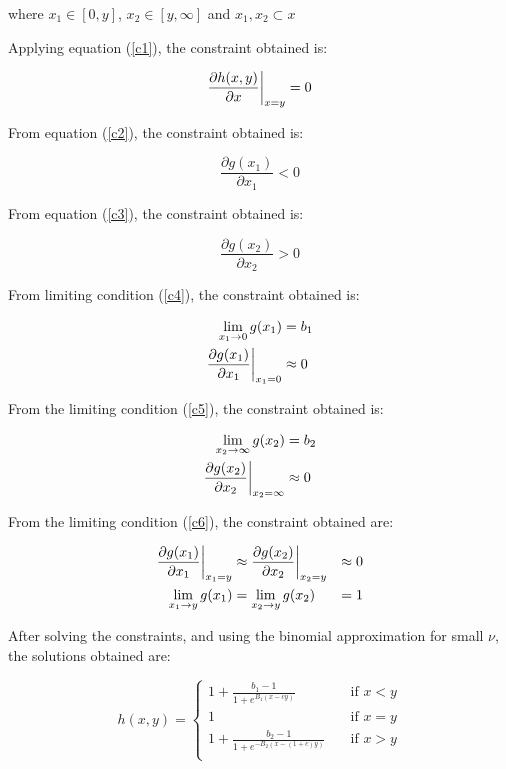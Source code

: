 where $x_1 \in [0, y]$, $x_2 \in [y, \infty]$ and $x_1, x_2 \subset x$

Applying equation (\ref{c1}), the constraint obtained is:

\begin{equation}
\frac{\partial h(x, y)}{\partial x}\at[\bigg]{x=y} = 0
\end{equation}

From equation (\ref{c2}), the constraint obtained is:

\begin{equation*}
\frac{\partial g(x_1)}{\partial x_1} < 0
\end{equation*}

From equation (\ref{c3}), the constraint obtained is:

\begin{equation*}
\frac{\partial g(x_2)}{\partial x_2} > 0
\end{equation*}


From limiting condition (\ref{c4}), the constraint obtained is: 

\begin{align}
\lim_{x_1 \to 0} g(x_1) &= b_1 \\
\frac{\partial g(x_1)}{\partial x_1}\at[\bigg]{x_1 = 0} &\approx 0
\end{align}

From the limiting condition (\ref{c5}), the constraint obtained is: 

\begin{align}
\lim_{x_2 \to \infty} g(x_2) &= b_2 \\
\frac{\partial g(x_2)}{\partial x_2}\at[\bigg]{x_2 = \infty} &\approx 0
\end{align}

From the limiting condition (\ref{c6}), the constraint obtained are: 

\begin{align}
\frac{\partial g(x_1)}{\partial x_1}\at[\bigg]{x_1 = y} &\approx \frac{\partial g(x_2)}{\partial x_2}\at[\bigg]{x_2 = y} &\approx 0  \\
\lim_{x_1 \to y} g(x_1) &= \lim_{x_2 \to y} g(x_2) &= 1 
\end{align}

After solving the constraints, and using the binomial approximation for small $\nu$, the solutions obtained are:

\begin{equation}
h(x, y) = 
\begin{cases}
1 + \frac{b_1 - 1}{1 + e^{B_1(x - cy)}}       & \quad \text{if } x < y\\
1 & \quad \text{if } x = y\\
1 + \frac{b_2 - 1}{1 + e^{-B_2(x - (1 + c)y)}}  & \quad \text{if } x > y\\
\end{cases}
\end{equation}


